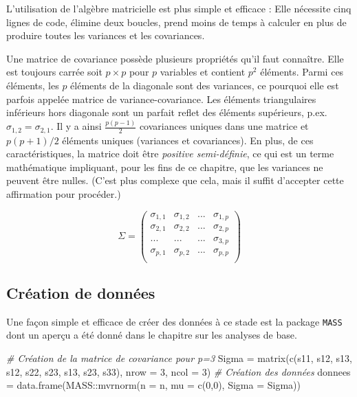 \documentclass[
]{book}
\newenvironment{Shaded}{}{}
\newcommand{\AttributeTok}[1]{#1}
\newcommand{\CommentTok}[1]{\textit{#1}}
\newcommand{\DecValTok}[1]{#1}
\newcommand{\FunctionTok}[1]{#1}
\newcommand{\NormalTok}[1]{#1}
\newcommand{\OtherTok}[1]{#1}
\newcommand{\SpecialCharTok}[1]{#1}
\begin{document}
L'utilisation de l'algèbre matricielle est plus simple et efficace : Elle nécessite cinq lignes de code, élimine deux boucles, prend moins de temps à calculer en plus de produire toutes les variances et les covariances.

Une matrice de covariance possède plusieurs propriétés qu'il faut connaître. Elle est toujours carrée soit \(p \times p\) pour \(p\) variables et contient \(p^2\) éléments. Parmi ces éléments, les \(p\) éléments de la diagonale sont des variances, ce pourquoi elle est parfois appelée matrice de variance-covariance. Les éléments triangulaires inférieurs hors diagonale sont un parfait reflet des éléments supérieurs, p.ex. \(\sigma_{1,2} = \sigma_{2,1}\). Il y a ainsi \(\frac{p(p-1)}{2}\) covariances uniques dans une matrice et \(p(p+1)/2\) éléments uniques (variances et covariances). En plus, de ces caractéristiques, la matrice doit être \emph{positive semi-définie}, ce qui est un terme mathématique impliquant, pour les fins de ce chapitre, que les variances ne peuvent être nulles. (C'est plus complexe que cela, mais il suffit d'accepter cette affirmation pour procéder.)

\[
\Sigma = \left( 
\begin{array}{cccc}
\sigma_{1,1} & \sigma_{1,2} & ... &  \sigma_{1,p}\\
\sigma_{2,1} & \sigma_{2,2} & ... &  \sigma_{2,p}\\
...& ...& ... &  \sigma_{3,p}\\
\sigma_{p,1} & \sigma_{p,2} & ... &  \sigma_{p,p}\\
\end{array}
\right)
\]

\hypertarget{cruxe9ation-de-donnuxe9es}{%
\subsection{Création de données}\label{cruxe9ation-de-donnuxe9es}}

Une façon simple et efficace de créer des données à ce stade est la package \texttt{MASS} dont un aperçu a été donné dans le chapitre sur les analyses de base.

\begin{Shaded}
\begin{Highlighting}[]
\CommentTok{\# Création de la matrice de covariance pour p=3}
\NormalTok{Sigma }\OtherTok{=} \FunctionTok{matrix}\NormalTok{(}\FunctionTok{c}\NormalTok{(s11, s12, s13,}
\NormalTok{                 s12, s22, s23,}
\NormalTok{                 s13, s23, s33), }\AttributeTok{nrow =} \DecValTok{3}\NormalTok{, }\AttributeTok{ncol =} \DecValTok{3}\NormalTok{)}
\CommentTok{\# Création des données }
\NormalTok{donnees }\OtherTok{=} \FunctionTok{data.frame}\NormalTok{(MASS}\SpecialCharTok{::}\FunctionTok{mvrnorm}\NormalTok{(}\AttributeTok{n =}\NormalTok{ n, }\AttributeTok{mu =} \FunctionTok{c}\NormalTok{(}\DecValTok{0}\NormalTok{,}\DecValTok{0}\NormalTok{), }\AttributeTok{Sigma =}\NormalTok{ Sigma))}
\end{Highlighting}
\end{Shaded}
\end{document}
